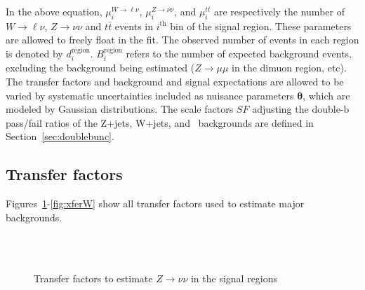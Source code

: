 In the above equation, $\mu_i^{W\rightarrow\ell\nu}$, $\mu_i^{Z\rightarrow\nu\nu}$,  and $\mu_i^{t\bar{t}}$ are respectively the number of $W\rightarrow\ell\nu$, $Z\rightarrow\nu\nu$ and $t\bar{t}$ events in $i^\text{th}$ bin of the signal region. 
These parameters are allowed to freely float in the fit.
The observed number of events in each region is denoted by $d_i^\text{region}$. 
$B_i^\text{region}$ refers to the number of expected background events, excluding the background being estimated ($Z\rightarrow\mu\mu$ in the dimuon region, etc).
The transfer factors and background and signal expectations are allowed to be varied by systematic uncertainties included as nuisance parameters $\pmb\theta$, which are modeled by Gaussian distributions. The scale factors $SF$ adjusting the double-b pass/fail ratios of the Z+jets, W+jets, and \ttbar~backgrounds are defined in Section~\ref{sec:doublebunc}.

\subsection{Transfer factors}

Figures~\ref{fig:xferZvv}-\ref{fig:xferW} show all transfer factors used to estimate major backgrounds.

\begin{figure}[htbp]
  \centering
    \\
    \\
   \caption{Transfer factors to estimate $Z\rightarrow\nu\nu$ in the signal regions}
  \label{fig:xferZvv}
\end{figure}


